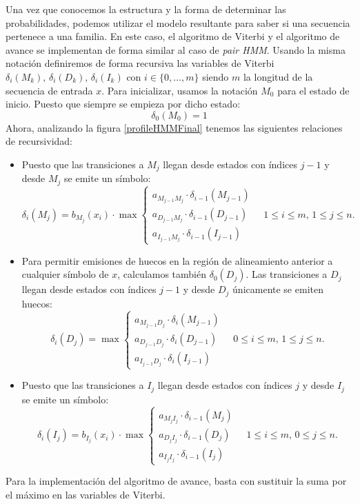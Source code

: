 Una vez que conocemos la estructura y la forma de determinar las probabilidades, podemos utilizar el modelo resultante para saber si una secuencia pertenece a una familia. En este caso, el algoritmo de Viterbi y el algoritmo de avance se implementan de forma similar al caso de \textit{pair HMM}. Usando la misma notación definiremos de forma recursiva las variables de Viterbi $\delta_{i}(M_k),\,\delta_{i}(D_k),\,\delta_{i}(I_k)$ con $i\in\{0,\dots,m\}$ siendo $m$ la longitud de la secuencia de entrada $x$. Para inicializar, usamos la notación $M_0$ para el estado de inicio. Puesto que siempre se empieza por dicho estado:
\[\delta_0(M_0)=1\]
Ahora, analizando la figura \ref{profileHMMFinal} tenemos las siguientes relaciones de recursividad:
\begin{itemize}
    \item Puesto que las transiciones a $M_j$ llegan desde estados con índices $j-1$ y desde $M_j$ se emite un símbolo:
    \[\delta_{i}(M_j)=b_{M_j}(x_i)\cdot \max
    \begin{cases}
        a_{M_{j-1}M_j}\cdot\delta_{i-1}(M_{j-1}) \\
        a_{D_{j-1}M_j}\cdot\delta_{i-1}(D_{j-1}) \\
        a_{I_{j-1}M_j}\cdot\delta_{i-1}(I_{j-1})
    \end{cases} \quad 1\leq i\leq m, \, 1\leq j \leq n.\] 

    \item Para permitir emisiones de huecos en la región de alineamiento anterior a cualquier símbolo de $x$, calculamos también $\delta_{0}(D_j)$. Las transiciones a $D_j$ llegan desde estados con índices $j-1$ y desde $D_j$ únicamente se emiten huecos:
    \[\delta_{i}(D_j)=\max
    \begin{cases}
        a_{M_{j-1}D_j}\cdot\delta_{i}(M_{j-1}) \\
        a_{D_{j-1}D_j}\cdot\delta_{i}(D_{j-1}) \\
        a_{I_{j-1}D_j}\cdot\delta_{i}(I_{j-1})
    \end{cases} \quad 0\leq i\leq m, \, 1\leq j \leq n.\] 

    \item Puesto que las transiciones a $I_j$ llegan desde estados con índices $j$ y desde $I_j$ se emite un símbolo:
    \[\delta_{i}(I_j)=b_{I_j}(x_i)\cdot \max
    \begin{cases}
        a_{M_{j}I_j}\cdot\delta_{i-1}(M_{j}) \\
        a_{D_{j}I_j}\cdot\delta_{i-1}(D_{j}) \\
        a_{I_{j}I_j}\cdot\delta_{i-1}(I_{j})
    \end{cases} \quad 1\leq i\leq m, \, 0\leq j \leq n.\] 

\end{itemize}
Para la implementación del algoritmo de avance, basta con sustituir la suma por el máximo en las variables de Viterbi.

